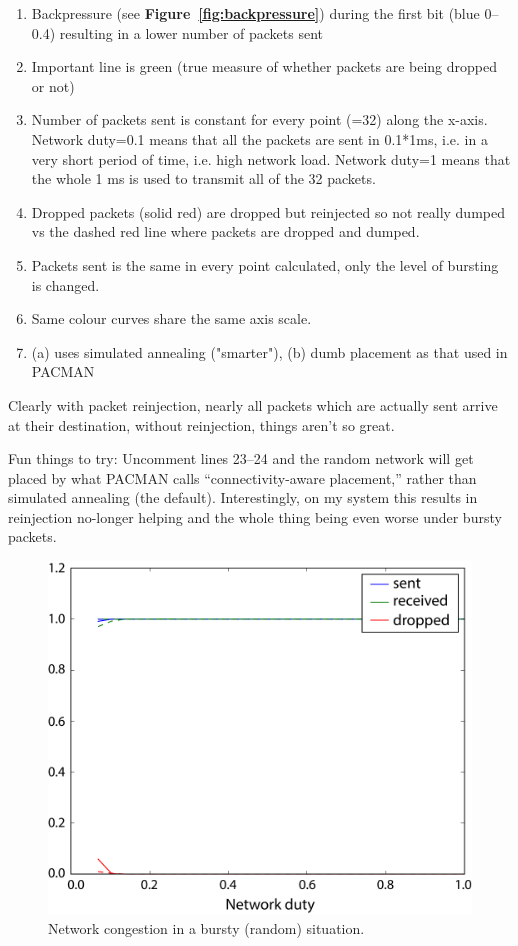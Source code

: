 \documentclass[a4paper, 11pt]{article}
\newlength\drop
\begin{document}
\begin{enumerate}
\item Backpressure (see \textbf{Figure~\ref{fig:backpressure}}) during the first bit (blue 0--0.4) resulting in a lower number of packets sent
\item Important line is green (true measure of whether packets are being dropped or not)
\item Number of packets sent is constant for every point (=32) along the x-axis. Network duty=0.1 means that all the packets are sent in 0.1*1ms, i.e. in a very short period of time, i.e. high network load. Network duty=1 means that the whole 1 ms is used to transmit all of the 32 packets.
\item Dropped packets (solid red) are dropped but reinjected so not really dumped vs the dashed red line where packets are dropped and dumped.
\item Packets sent is the same in every point calculated, only the level of bursting is changed.
\item Same colour curves share the same axis scale.
\item (a) uses simulated annealing ("smarter"), (b) dumb placement as that used in PACMAN
\end{enumerate}

Clearly with packet reinjection, nearly all packets which are actually sent arrive at their destination, without reinjection, things aren't so great.

Fun things to try: Uncomment lines 23--24 and the random network will get placed by what PACMAN calls ``connectivity-aware placement,'' rather than simulated annealing (the default). Interestingly, on my system this results in reinjection no-longer helping and the whole thing being even worse under bursty packets.

\begin{figure}[htbp]
	\centering
	\includegraphics[width=0.5\linewidth]{images/bursting_random.pdf}
	\caption{Network congestion in a bursty (random) situation.}	
	\label{fig:bursting_random}
\end{figure}
\end{document}
